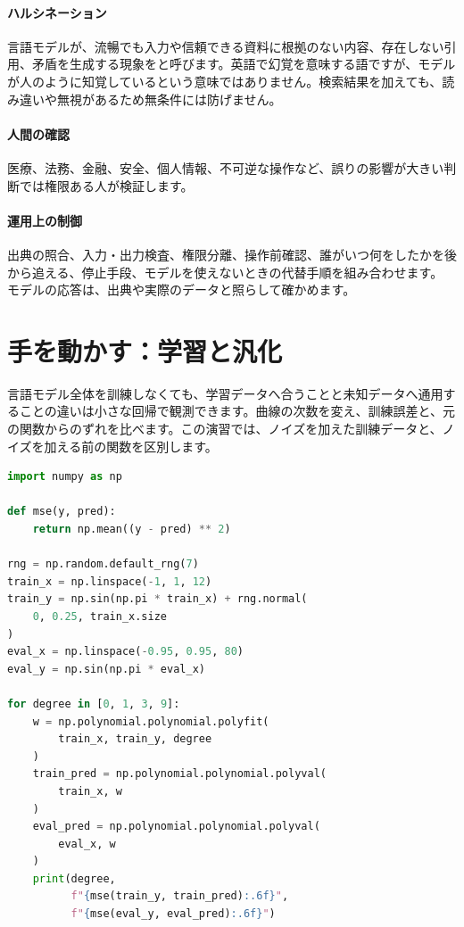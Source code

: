 \par
\endgroup
\medskip
\begingroup
\paragraph{ハルシネーション}
        言語モデルが、流暢でも入力や信頼できる資料に根拠のない内容、存在しない引用、矛盾を生成する現象をと呼びます。英語で幻覚を意味する語ですが、モデルが人のように知覚しているという意味ではありません。検索結果を加えても、読み違いや無視があるため無条件には防げません。

\par
\endgroup
\medskip
\begingroup
\paragraph{人間の確認}
        医療、法務、金融、安全、個人情報、不可逆な操作など、誤りの影響が大きい判断では権限ある人が検証します。

\par
\endgroup
  \vspace{5mm}
\paragraph{運用上の制御}
    出典の照合、入力・出力検査、権限分離、操作前確認、誰がいつ何をしたかを後から追える、停止手段、モデルを使えないときの代替手順を組み合わせます。
    モデルの応答は、出典や実際のデータと照らして確かめます。

\par
\endgroup


\section{手を動かす：学習と汎化}
\label{sec:06-machine-learning-34}

言語モデル全体を訓練しなくても、学習データへ合うことと未知データへ通用することの違いは小さな回帰で観測できます。曲線の次数を変え、訓練誤差と、元の関数からのずれを比べます。この演習では、ノイズを加えた訓練データと、ノイズを加える前の関数を区別します。

\begingroup
\begingroup
\noindent\begin{minipage}{\linewidth}
      \begin{lstlisting}[language=Python]
import numpy as np

def mse(y, pred):
    return np.mean((y - pred) ** 2)

rng = np.random.default_rng(7)
train_x = np.linspace(-1, 1, 12)
train_y = np.sin(np.pi * train_x) + rng.normal(
    0, 0.25, train_x.size
)
eval_x = np.linspace(-0.95, 0.95, 80)
eval_y = np.sin(np.pi * eval_x)

for degree in [0, 1, 3, 9]:
    w = np.polynomial.polynomial.polyfit(
        train_x, train_y, degree
    )
    train_pred = np.polynomial.polynomial.polyval(
        train_x, w
    )
    eval_pred = np.polynomial.polynomial.polyval(
        eval_x, w
    )
    print(degree,
          f"{mse(train_y, train_pred):.6f}",
          f"{mse(eval_y, eval_pred):.6f}")
      \end{lstlisting}
\end{minipage}
\par
\endgroup
\medskip
\begingroup
